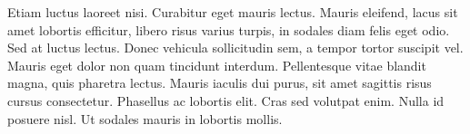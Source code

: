\documentclass{novel}
\begin{document}
Etiam luctus laoreet nisi. Curabitur eget mauris lectus. Mauris eleifend, lacus sit amet lobortis efficitur, libero risus varius turpis, in sodales diam felis eget odio. Sed at luctus lectus. Donec vehicula sollicitudin sem, a tempor tortor suscipit vel. Mauris eget dolor non quam tincidunt interdum. Pellentesque vitae blandit magna, quis pharetra lectus. Mauris iaculis dui purus, sit amet sagittis risus cursus consectetur. Phasellus ac lobortis elit. Cras sed volutpat enim. Nulla id posuere nisl. Ut sodales mauris in lobortis mollis. 
\end{document}
